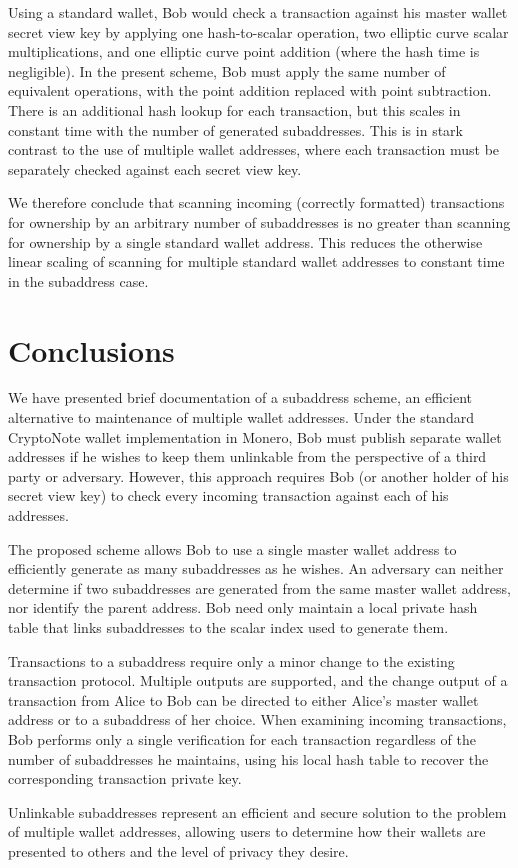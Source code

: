 \documentclass{mrl}
\begin{document}
Using a standard wallet, Bob would check a transaction against his master wallet secret view key by applying one hash-to-scalar operation, two elliptic curve scalar multiplications, and one elliptic curve point addition (where the hash time is negligible). In the present scheme, Bob must apply the same number of equivalent operations, with the point addition replaced with point subtraction. There is an additional hash lookup for each transaction, but this scales in constant time with the number of generated subaddresses. This is in stark contrast to the use of multiple wallet addresses, where each transaction must be separately checked against each secret view key.

We therefore conclude that scanning incoming (correctly formatted) transactions for ownership by an arbitrary number of subaddresses is no greater than scanning for ownership by a single standard wallet address. This reduces the otherwise linear scaling of scanning for multiple standard wallet addresses to constant time in the subaddress case.


\section{Conclusions}
We have presented brief documentation of a subaddress scheme, an efficient alternative to maintenance of multiple wallet addresses. Under the standard CryptoNote wallet implementation in Monero, Bob must publish separate wallet addresses if he wishes to keep them unlinkable from the perspective of a third party or adversary. However, this approach requires Bob (or another holder of his secret view key) to check every incoming transaction against each of his addresses.

The proposed scheme allows Bob to use a single master wallet address to efficiently generate as many subaddresses as he wishes. An adversary can neither determine if two subaddresses are generated from the same master wallet address, nor identify the parent address. Bob need only maintain a local private hash table that links subaddresses to the scalar index used to generate them.

Transactions to a subaddress require only a minor change to the existing transaction protocol. Multiple outputs are supported, and the change output of a transaction from Alice to Bob can be directed to either Alice's master wallet address or to a subaddress of her choice. When examining incoming transactions, Bob performs only a single verification for each transaction regardless of the number of subaddresses he maintains, using his local hash table to recover the corresponding transaction private key.

Unlinkable subaddresses represent an efficient and secure solution to the problem of multiple wallet addresses, allowing users to determine how their wallets are presented to others and the level of privacy they desire.



\end{document}
